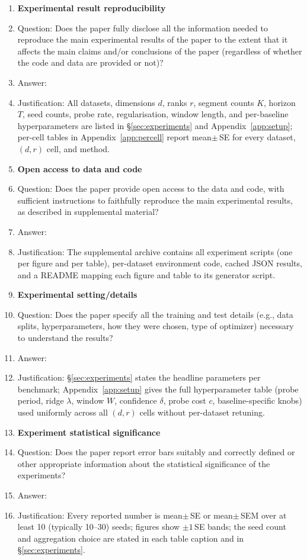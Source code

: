 \begin{enumerate}
    \item {\bf Experimental result reproducibility}
    \item[] Question: Does the paper fully disclose all the information needed to reproduce the main experimental results of the paper to the extent that it affects the main claims and/or conclusions of the paper (regardless of whether the code and data are provided or not)?
    \item[] Answer: \answerYes{}
    \item[] Justification: All datasets, dimensions $d$, ranks $r$, segment counts $K$, horizon $T$, seed counts, probe rate, regularisation, window length, and per-baseline hyperparameters are listed in \S\ref{sec:experiments} and Appendix~\ref{app:setup}; per-cell tables in Appendix~\ref{app:percell} report mean$\pm$\,SE for every dataset, $(d,r)$ cell, and method.

\item {\bf Open access to data and code}
    \item[] Question: Does the paper provide open access to the data and code, with sufficient instructions to faithfully reproduce the main experimental results, as described in supplemental material?
    \item[] Answer: \answerYes{}
    \item[] Justification: The supplemental archive contains all experiment scripts (one per figure and per table), per-dataset environment code, cached JSON results, and a README mapping each figure and table to its generator script.

\item {\bf Experimental setting/details}
    \item[] Question: Does the paper specify all the training and test details (e.g., data splits, hyperparameters, how they were chosen, type of optimizer) necessary to understand the results?
    \item[] Answer: \answerYes{}
    \item[] Justification: \S\ref{sec:experiments} states the headline parameters per benchmark; Appendix~\ref{app:setup} gives the full hyperparameter table (probe period, ridge $\lambda$, window $W$, confidence $\delta$, probe cost $c$, baseline-specific knobs) used uniformly across all $(d,r)$ cells without per-dataset retuning.

\item {\bf Experiment statistical significance}
    \item[] Question: Does the paper report error bars suitably and correctly defined or other appropriate information about the statistical significance of the experiments?
    \item[] Answer: \answerYes{}
    \item[] Justification: Every reported number is mean$\pm$\,SE or mean$\pm$\,SEM over at least 10 (typically 10--30) seeds; figures show $\pm 1$\,SE bands; the seed count and aggregation choice are stated in each table caption and in \S\ref{sec:experiments}.


\end{enumerate}
